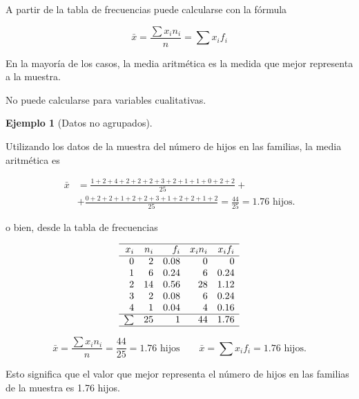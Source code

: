 \documentclass[
  spanish,
  a4paper,
]{scrreport}
\theoremstyle{plain}
\theoremstyle{definition}
\newtheorem{example}{Ejemplo}[chapter]
\theoremstyle{definition}
\theoremstyle{remark}
\begin{document}
A partir de la tabla de frecuencias puede calcularse con la fórmula

\[\bar{x} = \frac{\sum x_in_i}{n} = \sum x_i f_i\]

En la mayoría de los casos, la media aritmética es la medida que mejor
representa a la muestra.

\begin{tcolorbox}[enhanced jigsaw, arc=.35mm, bottomrule=.15mm, bottomtitle=1mm, breakable, colback=white, colbacktitle=quarto-callout-warning-color!10!white, colframe=quarto-callout-warning-color-frame, coltitle=black, left=2mm, leftrule=.75mm, opacityback=0, opacitybacktitle=0.6, rightrule=.15mm, title=\textcolor{quarto-callout-warning-color}{\faExclamationTriangle}\hspace{0.5em}{Advertencia}, titlerule=0mm, toprule=.15mm, toptitle=1mm]

No puede calcularse para variables cualitativas.

\end{tcolorbox}

\begin{example}[Datos no
agrupados]\protect\hypertarget{exm-media-datos-no-agrupados}{}\label{exm-media-datos-no-agrupados}

Utilizando los datos de la muestra del número de hijos en las familias,
la media aritmética es

\begin{align*}
\bar{x} &= \frac{1+2+4+2+2+2+3+2+1+1+0+2+2}{25}+\\
 &+\frac{0+2+2+1+2+2+3+1+2+2+1+2}{25} = \frac{44}{25} = 1.76 \mbox{ hijos}.
\end{align*}

o bien, desde la tabla de frecuencias

\[
\begin{array}{rrrrr}
\hline
x_i & n_i & f_i & x_in_i & x_if_i\\
\hline
0 & 2 & 0.08 & 0 & 0\\
1 & 6 & 0.24 & 6 & 0.24\\
2 & 14 & 0.56 & 28 & 1.12\\
3 & 2  & 0.08 & 6 & 0.24\\
4 & 1 & 0.04 & 4 & 0.16 \\
\hline
\sum & 25 & 1 & 44 & 1.76 \\
\hline
\end{array}
\]

\[
\bar{x} = \frac{\sum x_in_i}{n} = \frac{44}{25}= 1.76 \mbox{ hijos}\qquad \bar{x}=\sum{x_if_i} = 1.76 \mbox{ hijos}.
\]

Esto significa que el valor que mejor representa el número de hijos en
las familias de la muestra es 1.76 hijos.

\end{example}
\end{document}
